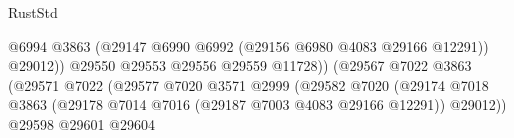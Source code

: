 \begin{lexlean}{RustStd}
\begin{coremodule}
                                                              @6994
                                                              @3863
                                                              (@29147
                                                                @6990
                                                                @6992
                                                                (@29156 @6980 @4083 @29166 @12291))
                                                              @29012))
                                                          @29550
                                                          @29553
                                                          @29556
                                                          @29559
                                                          @11728))
                                                      (@29567
                                                        @7022
                                                        @3863
                                                        (@29571
                                                          @7022
                                                          (@29577
                                                            @7020
                                                            @3571
                                                            @2999
                                                            (@29582
                                                              @7020
                                                              (@29174
                                                                @7018
                                                                @3863
                                                                (@29178
                                                                  @7014
                                                                  @7016
                                                                  (@29187
                                                                    @7003
                                                                    @4083
                                                                    @29166
                                                                    @12291))
                                                                @29012))
                                                            @29598
                                                            @29601
                                                            @29604

\end{coremodule}
\end{lexlean}
